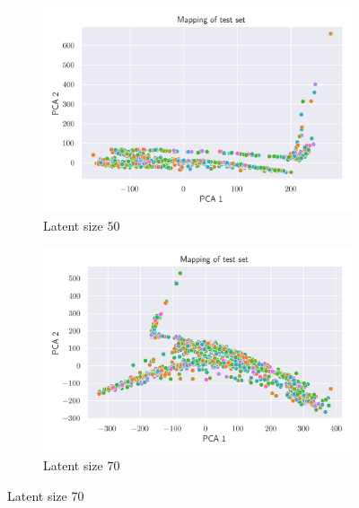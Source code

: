 \documentclass[12pt,a4paper]{article}
\begin{document}
\begin{figure}[H] %
    \begin{subfigure}{0.48\textwidth}
    \includegraphics[width=\textwidth]{src/gaussian_pca_50.png}
    \caption{Latent size $50$}
    \end{subfigure}\hspace*{\fill}
    \begin{subfigure}{0.48\textwidth}
    \includegraphics[width=\textwidth]{src/gaussian_pca_70.png}
    \caption{Latent size $70$}
    \end{subfigure}
    

\end{figure}
\end{document}
